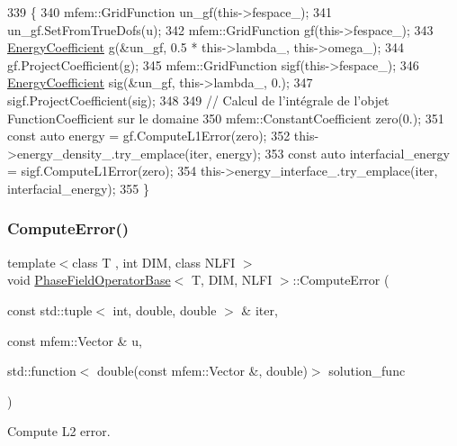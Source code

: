 \begin{DoxyCode}
339                                                                     \{
340   mfem::GridFunction un\_gf(this->fespace\_);
341   un\_gf.SetFromTrueDofs(u);
342   mfem::GridFunction gf(this->fespace\_);
343   \hyperlink{classEnergyCoefficient}{EnergyCoefficient} g(&un\_gf, 0.5 * this->lambda\_, this->omega\_);
344   gf.ProjectCoefficient(g);
345   mfem::GridFunction sigf(this->fespace\_);
346   \hyperlink{classEnergyCoefficient}{EnergyCoefficient} sig(&un\_gf, this->lambda\_, 0.);
347   sigf.ProjectCoefficient(sig);
348 
349   \textcolor{comment}{// Calcul de l'intégrale de l'objet FunctionCoefficient sur le domaine}
350   mfem::ConstantCoefficient zero(0.);
351   \textcolor{keyword}{const} \textcolor{keyword}{auto} energy = gf.ComputeL1Error(zero);
352   this->energy\_density\_.try\_emplace(iter, energy);
353   \textcolor{keyword}{const} \textcolor{keyword}{auto} interfacial\_energy = sigf.ComputeL1Error(zero);
354   this->energy\_interface\_.try\_emplace(iter, interfacial\_energy);
355 \}
\end{DoxyCode}
\mbox{\label{classPhaseFieldOperatorBase_ae2166b96b4d740e05c5dd1ca36e9fc8c}} 
\subsubsection{\texorpdfstring{Compute\+Error()}{ComputeError()}}
{\footnotesize\ttfamily template$<$class T , int D\+IM, class N\+L\+FI $>$ \\
void \hyperlink{classPhaseFieldOperatorBase}{Phase\+Field\+Operator\+Base}$<$ T, D\+IM, N\+L\+FI $>$\+::Compute\+Error (\begin{DoxyParamCaption}\item[{const std\+::tuple$<$ int, double, double $>$ \&}]{iter,  }\item[{const mfem\+::\+Vector \&}]{u,  }\item[{std\+::function$<$ double(const mfem\+::\+Vector \&, double)$>$}]{solution\+\_\+func }\end{DoxyParamCaption})\hspace{0.3cm}{\ttfamily [inherited]}}



Compute L2 error. 


